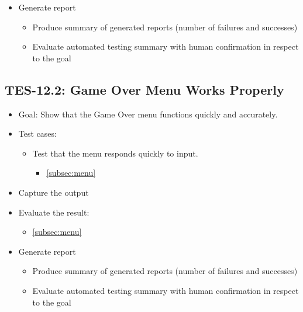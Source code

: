 \begin{itemize}
\item Generate report 
\begin{itemize}
\item Produce summary of generated reports (number of failures and successes)
\item Evaluate automated testing summary with human confirmation in respect to the goal
\end{itemize}
\end{itemize}

\subsection{TES-12.2: Game Over Menu Works Properly }
\begin{itemize}
\item Goal: Show that the Game Over menu functions quickly and accurately. 

\item Test cases: 
\begin{itemize}
\item Test that the menu responds quickly to input.
\begin{itemize}
\item \ref{subsec:menu}
\end{itemize}
\end{itemize}

\item Capture the output 

\item Evaluate the result: 
\begin{itemize}
\item \ref{subsec:menu}
\end{itemize}

\item Generate report 
\begin{itemize}
\item Produce summary of generated reports (number of failures and successes)
\item Evaluate automated testing summary with human confirmation in respect to the goal
\end{itemize}
\end{itemize}

